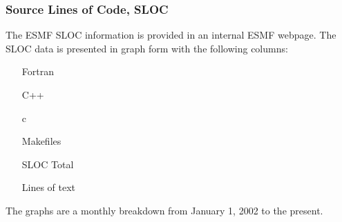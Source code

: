 \subsubsection{Source Lines of Code, SLOC}
The ESMF SLOC information is provided in an internal ESMF webpage. The
SLOC data is presented in graph form with the following columns:
\begin{enumerate}
\item[Fortran] 
\item[C++] 
\item[c] 
\item[Makefiles] 
\item[SLOC Total] 
\item[Lines of text] 
\end{enumerate}

The graphs are a monthly breakdown from January 1, 2002 to the present.
























